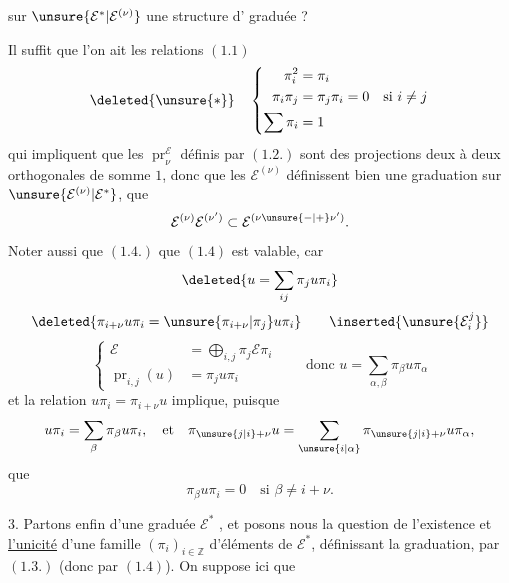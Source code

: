 sur $\unsure{\mathcal E^*|\mathcal E^{(\nu)}}$ une structure d' graduée ?

Il suffit que l'on ait les relations $(1.1)$
\[
\deleted{\unsure{*}}\quad\left\{\begin{aligned}
\pi_i^2&=\pi_i\\
\pi_i\pi_j&=\pi_j\pi_i=0\quad\text{si }i\neq j\\
\sum\pi_i&=1
\end{aligned}\right.
\]
qui impliquent que les $\operatorname{pr}_{\nu}^{\mathcal E}$ définis par $(1.2.)$ sont des projections deux à deux orthogonales de somme $1$, donc que les $\mathcal E^{(\nu)}$ définissent bien une graduation  sur $\unsure{\mathcal E^{(\nu)}|\mathcal E^*}$,  que
\[
\mathcal E^{(\nu)}\mathcal E^{(\nu')}\subset\mathcal E^{(\nu\unsure{-|+}\nu')}.
\]
Noter aussi que $(1.4.)$ que $(1.4)$ est valable, car 
\[
\deleted{u=\sum_{ij}\pi_j u\pi_i}
\]
\[
\deleted{\pi_{i+\nu}u\pi_i=\unsure{\pi_{i+\nu}|\pi_j}u\pi_i}
\qquad\inserted{\unsure{\mathcal E_i^j}}
\]
\[
\left\{\begin{aligned}
\mathcal E&=\bigoplus_{i,j}\pi_j\mathcal E\pi_i\\
\operatorname{pr}_{i,j}(u)&=\pi_j u\pi_i
\end{aligned}\right.
\qquad\text{donc }u=\sum_{\alpha,\beta}\pi_\beta u\pi_\alpha
\]
et la relation $u\pi_i=\pi_{i+\nu}u$ implique, puisque
\[
u\pi_i=\sum_\beta\pi_\beta u\pi_i,\quad\text{et}\quad
\pi_{\unsure{j|i}+\nu}u=\sum_{\unsure{i|\alpha}}\pi_{\unsure{j|i}+\nu}u\pi_\alpha,
\]
que
\[
\pi_\beta u\pi_i=0\quad\text{si }\beta\neq i+\nu.
\]

3.  Partons enfin d'une  graduée $\mathcal E^*$ , et posons nous la question de l'existence et \uline{l'unicité} d'une famille $(\pi_i)_{i\in\mathbb Z}$ d'éléments de $\mathcal E^*$,  définissant la graduation, par $(1.3.)$ (donc par $(1.4)$). On  suppose ici que
